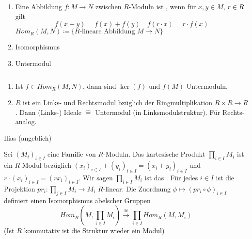 \documentclass[../main.tex]{subfiles}
\begin{document}
\begin{definition}$ $
    \begin{enumerate}[label=(\alph*)]
        \item Eine Abbildung $f:M\rightarrow N$ zwischen $R$-Moduln ist , wenn für $x,y\in M$, $r\in R$ gilt
        $$f(x+y) = f(x) + f(y) \quad f(r\cdot x) = r\cdot f(x)$$
        $Hom_R(M,N) \coloneqq \{\text{$R$-lineare Abbildung $M\rightarrow N$}\}$
        \item Isomorphismus
        \item Untermodul
    \end{enumerate}
\end{definition}
\begin{example} $ $
    \begin{enumerate}[label=(\alph*)]
        \item Ist $f\in Hom_R(M,N)$, dann sind $\ker(f)$ und $f(M)$ Untermoduln.
        \item $R$ ist ein Links- und Rechtsmodul bzüglich der Ringmultiplikation $R\times R \rightarrow R$. Dann (Links-) Ideale $\hat{=}$ Untermodul (in Linksmodulstruktur). Für Rechts- analog.
    \end{enumerate}
\end{example}

Ilias (angeblich)

\setcounter{theorem}{8}
\begin{definition}
    Sei $(M_i)_{i\in I}$ eine Familie von $R$-Moduln. Das kartesische Produkt $\prod_{i\in I} M_i$ ist ein $R$-Modul bezüglich $(x_i)_{i\in I} + (y_i)_{i\in I} = (x_i + y_i)_{i\in I}$ und $r\cdot (x_i)_{i\in I} = (rx_i)_{i\in I}$.
    Wir sagen $\prod_{i\in I} M_i$ ist das . Für jedes $i\in I$ ist die Projektion $pr_i: \prod_{j\in I} M_i \rightarrow M_i$ $R$-linear.
    Die Zuordnung $\phi\mapsto (pr_i \circ \phi)_{i\in I}$ definiert einen Isomorphismus abelscher Gruppen
    $$Hom_R(M,\prod_{i\in I} M_i)\overset{\cong}{\rightarrow} \prod_{i\in I} Hom_R(M,M_i)$$
    (Ist $R$ kommutativ ist die Struktur wieder ein Modul)
\end{definition}
\begin{remark*}
\end{remark*}
\end{document}
